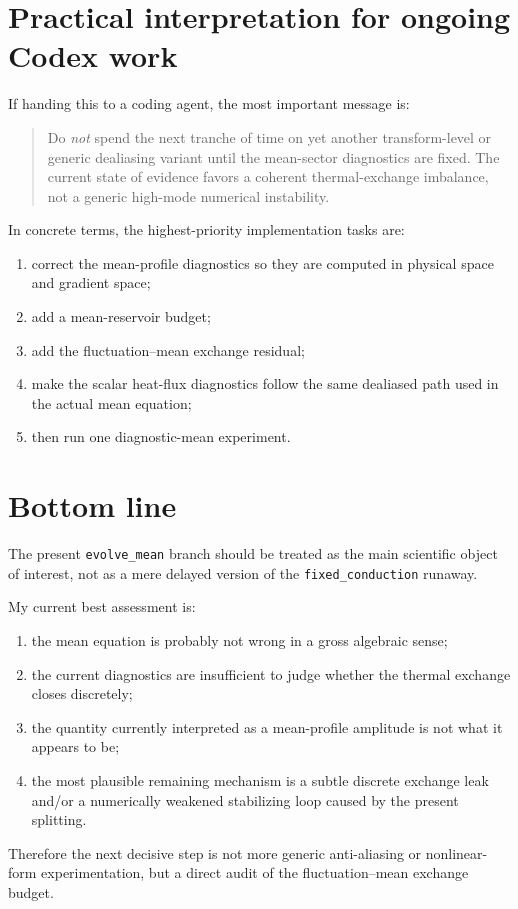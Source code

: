 \documentclass[11pt]{article}
\begin{document}
\section{Practical interpretation for ongoing Codex work}

If handing this to a coding agent, the most important message is:

\begin{quote}
Do \emph{not} spend the next tranche of time on yet another transform-level or generic dealiasing variant until the mean-sector diagnostics are fixed. The current state of evidence favors a coherent thermal-exchange imbalance, not a generic high-mode numerical instability.
\end{quote}

In concrete terms, the highest-priority implementation tasks are:

\begin{enumerate}
\item correct the mean-profile diagnostics so they are computed in physical space and gradient space;
\item add a mean-reservoir budget;
\item add the fluctuation--mean exchange residual;
\item make the scalar heat-flux diagnostics follow the same dealiased path used in the actual mean equation;
\item then run one diagnostic-mean experiment.
\end{enumerate}

\section{Bottom line}

The present \texttt{evolve\_mean} branch should be treated as the main scientific object of interest, not as a mere delayed version of the \texttt{fixed\_conduction} runaway.

My current best assessment is:

\begin{enumerate}
\item the mean equation is probably not wrong in a gross algebraic sense;
\item the current diagnostics are insufficient to judge whether the thermal exchange closes discretely;
\item the quantity currently interpreted as a mean-profile amplitude is not what it appears to be;
\item the most plausible remaining mechanism is a subtle discrete exchange leak and/or a numerically weakened stabilizing loop caused by the present splitting.
\end{enumerate}

Therefore the next decisive step is not more generic anti-aliasing or nonlinear-form experimentation, but a direct audit of the fluctuation--mean exchange budget.
\end{document}
